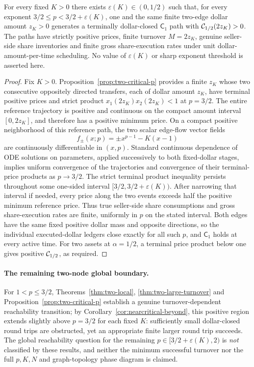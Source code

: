 \documentclass[review,hidelinks,onefignum,onetabnum]{siamonline250211}%
\begin{document}
\begin{corollary}[Reachability extends strictly beyond $p=3/2$]
\label{cor:nearcritical-beyond}
For every fixed $K>0$ there exists
$\varepsilon(K)\in(0,1/2)$ such that, for every exponent
$3/2\le p<3/2+\varepsilon(K)$, one and the same finite
two-edge dollar amount $z_K>0$ generates a terminally
dollar-closed $\mathsf C_1$ path with
$\mathcal{C}_{1/2}(2z_K)>0$.
The paths have strictly positive prices, finite
turnover $M=2z_K$, genuine seller-side share
inventories and finite gross share-execution rates
under unit dollar-amount-per-time scheduling.
No value of $\varepsilon(K)$ or sharp exponent
threshold is asserted here.
\end{corollary}
\begin{proof}
Fix $K>0$. Proposition~\ref{prop:two-critical-p}
provides a finite $z_K$ whose two consecutive
oppositely directed transfers, each of dollar amount
$z_K$, have terminal positive prices and strict
product $x_1(2z_K)x_2(2z_K)<1$ at $p=3/2$.
The entire reference trajectory is positive and
continuous on the compact amount interval
$[0,2z_K]$, and therefore has a positive minimum
price. On a compact positive neighborhood of this
reference path, the two scalar edge-flow vector
fields
\[
 f_\pm(x;p)=\pm x^{p-1}-K(x-1)
\]
are continuously differentiable in $(x,p)$.
Standard continuous dependence of ODE solutions
on parameters, applied successively to both
fixed-dollar stages, implies uniform convergence
of the trajectories and convergence of their
terminal-price products as $p\to3/2$.
The strict terminal product inequality persists
throughout some one-sided interval
$[3/2,3/2+\varepsilon(K))$.
After narrowing that interval if needed, every
price along the two events exceeds half the
positive minimum reference price. Thus true
seller-side share consumptions and gross
share-execution rates are finite, uniformly in
$p$ on the stated interval. Both edges have
the same fixed positive dollar mass and opposite
directions, so the individual executed-dollar
ledgers close exactly for all such $p$, and
$\mathsf C_1$ holds at every active time.
For two assets at $\alpha=1/2$, a terminal
price product below one gives positive
$\mathcal{C}_{1/2}$, as required.
\end{proof}

\paragraph{The remaining two-node global boundary.}
For $1<p\le3/2$, Theorems~\ref{thm:two-local},
\ref{thm:two-large-turnover} and
Proposition~\ref{prop:two-critical-p} establish a genuine
turnover-dependent reachability transition; by
Corollary~\ref{cor:nearcritical-beyond}, this positive
region extends slightly above $p=3/2$ for each fixed $K$: sufficiently
small dollar-closed round trips are obstructed, yet an
appropriate finite larger round trip succeeds. The
global reachability question for the remaining
$p\in[3/2+\varepsilon(K),2)$ is \emph{not}
classified by these results, and neither
the minimum successful turnover nor the full
$p,K,N$ and graph-topology phase diagram is claimed.
\end{document}
